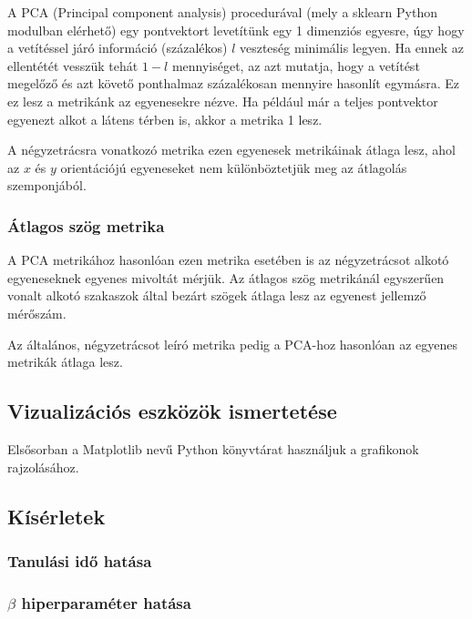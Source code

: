 \documentclass[12pt]{article}
\begin{document}
A PCA (Principal component analysis) procedurával (mely a sklearn Python modulban elérhető) egy pontvektort levetítünk egy 1 dimenziós egyesre, úgy hogy a vetítéssel járó információ (százalékos) $l$ veszteség minimális legyen. Ha ennek az ellentétét vesszük tehát $1-l$ mennyiséget, az azt mutatja, hogy a vetítést megelőző és azt követő ponthalmaz százalékosan mennyire hasonlít egymásra. Ez ez lesz a metrikánk az egyenesekre nézve. Ha például már a teljes pontvektor egyenezt alkot a látens térben is, akkor a metrika 1 lesz.

A négyzetrácsra vonatkozó metrika ezen egyenesek metrikáinak átlaga lesz, ahol az $x$ és $y$ orientációjú egyeneseket nem különböztetjük meg az átlagolás szemponjából.

\subsubsection{Átlagos szög metrika}

A PCA metrikához hasonlóan ezen metrika esetében is az négyzetrácsot alkotó egyeneseknek egyenes mivoltát mérjük. Az átlagos szög metrikánál egyszerűen vonalt alkotó szakaszok által bezárt szögek átlaga lesz az egyenest jellemző mérőszám. 

Az általános, négyzetrácsot leíró metrika pedig a PCA-hoz hasonlóan az egyenes metrikák átlaga lesz.

\subsection{Vizualizációs eszközök ismertetése}

Elsősorban a Matplotlib nevű Python könyvtárat használjuk a grafikonok rajzolásához.

\subsection{Kísérletek}



\subsubsection{Tanulási idő hatása}



\subsubsection{$\beta$ hiperparaméter hatása}
\end{document}
